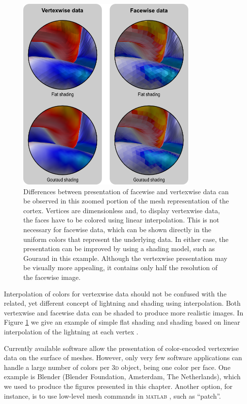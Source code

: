 \begin{figure}[!tp]  %
\centering
\includegraphics[width=9cm]{images/display.png}
\caption[Differences between presentation of facewise and vertexwise area.]{Differences between presentation of facewise and vertexwise data can be observed in this zoomed portion of the mesh representation of the cortex. Vertices are dimensionless and, to display vertexwise data, the faces have to be colored using linear interpolation. This is not necessary for facewise data, which can be shown directly in the uniform colors that represent the underlying data. In either case, the presentation can be improved by using a shading model, such as Gouraud in this example. Although the vertexwise presentation may be visually more appealing, it contains only half the resolution of the facewise image.}
\label{fig:areal:display}
\end{figure}

Interpolation of colors for vertexwise data should not be confused with the related, yet different concept of lightning and shading using interpolation. Both vertexwise and facewise data can be shaded to produce more realistic images. In Figure \ref{fig:areal:display} we give an example of simple flat shading and shading based on linear interpolation of the lightning at each vertex \citep{Gouraud1971}.

Currently available software allow the presentation of color-encoded vertexwise data on the surface of meshes. However, only very few software applications can handle a large number of colors per \textsc{3d} object, being one color per face. One example is Blender (Blender Foundation, Amsterdam, The Netherlands), which we used to produce the figures presented in this chapter. Another option, for instance, is to use low-level mesh commands in \textsc{matlab} \citep{MATLAB2015}, such as ``patch''.

